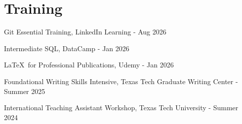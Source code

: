 \documentclass[letterpaper,10pt]{article}
\begin{document}
    \section{Training}
    \begin{description}[font=$\bullet$]
        \item{Git Essential Training, LinkedIn Learning - Aug 2026}
        \item{Intermediate SQL, DataCamp - Jan 2026}
        \item{\LaTeX\ for Professional Publications, Udemy - Jan 2026}
        \item{Foundational Writing Skills Intensive, Texas Tech Graduate Writing Center - Summer 2025}
        \item{International Teaching Assistant Workshop, Texas Tech University - Summer 2024}
    \end{description}
    \vspace{0.50em}

\end{document}

